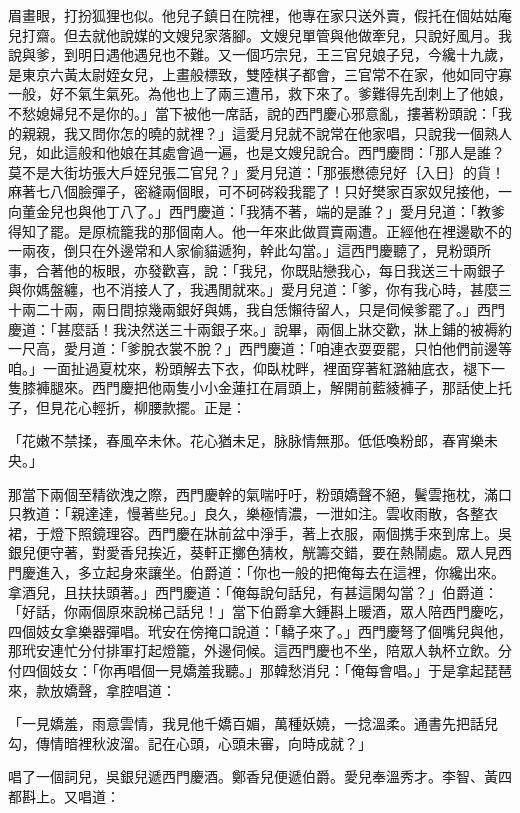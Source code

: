 眉畫眼，打扮狐狸也似。他兒子鎮日在院裡，他專在家只送外賣，假托在個姑姑庵兒打齋。但去就他說媒的文嫂兒家落腳。文嫂兒單管與他做牽兒，只說好風月。我說與爹，到明日遇他遇兒也不難。又一個巧宗兒，王三官兒娘子兒，今纔十九歲，是東京六黃太尉姪女兒，上畫般標致，雙陸棋子都會，三官常不在家，他如同守寡一般，好不氣生氣死。為他也上了兩三遭吊，救下來了。爹難得先刮刺上了他娘，不愁媳婦兒不是你的。」當下被他一席話，說的西門慶心邪意亂，摟著粉頭說：「我的親親，我又問你怎的曉的就裡？」這愛月兒就不說常在他家唱，只說我一個熟人兒，如此這般和他娘在其處會過一遍，也是文嫂兒說合。西門慶問：「那人是誰？莫不是大街坊張大戶姪兒張二官兒？」愛月兒道：「那張懋德兒好｛入日｝的貨！麻著七八個臉彈子，密縫兩個眼，可不砢硶殺我罷了！只好樊家百家奴兒接他，一向董金兒也與他丁八了。」西門慶道：「我猜不著，端的是誰？」愛月兒道：「教爹得知了罷。是原梳籠我的那個南人。他一年來此做買賣兩遭。正經他在裡邊歇不的一兩夜，倒只在外邊常和人家偷貓遞狗，幹此勾當。」這西門慶聽了，見粉頭所事，合著他的板眼，亦發歡喜，說：「我兒，你既貼戀我心，每日我送三十兩銀子與你媽盤纏，也不消接人了，我遇閒就來。」愛月兒道：「爹，你有我心時，甚麼三十兩二十兩，兩日間掠幾兩銀好與媽，我自恁懶待留人，只是伺候爹罷了。」西門慶道：「甚麼話！我決然送三十兩銀子來。」說畢，兩個上牀交歡，牀上鋪的被褥約一尺高，愛月道：「爹脫衣裳不脫？」西門慶道：「咱連衣耍耍罷，只怕他們前邊等咱。」一面扯過夏枕來，粉頭解去下衣，仰臥枕畔，裡面穿著紅潞紬底衣，褪下一隻膝褲腿來。西門慶把他兩隻小小金蓮扛在肩頭上，解開前藍綾褲子，那話使上托子，但見花心輕折，柳腰款擺。正是：

「花嫩不禁揉，春風卒未休。花心猶未足，脉脉情無那。低低喚粉郎，春宵樂未央。」

那當下兩個至精欲洩之際，西門慶幹的氣喘吁吁，粉頭嬌聲不絕，鬢雲拖枕，滿口只教道：「親達達，慢著些兒。」良久，樂極情濃，一泄如注。雲收雨散，各整衣裙，于燈下照鏡理容。西門慶在牀前盆中淨手，著上衣服，兩個携手來到席上。吳銀兒便守著，對愛香兒挨近，葵軒正擲色猜枚，觥籌交錯，要在熱鬧處。眾人見西門慶進入，多立起身來讓坐。伯爵道：「你也一般的把俺每去在這裡，你纔出來。拿酒兒，且扶扶頭著。」西門慶道：「俺每說句話兒，有甚這閑勾當？」伯爵道：「好話，你兩個原來說梯己話兒！」當下伯爵拿大鍾斟上暖酒，眾人陪西門慶吃，四個妓女拿樂器彈唱。玳安在傍掩口說道：「轎子來了。」西門慶弩了個嘴兒與他，那玳安連忙分付排軍打起燈籠，外邊伺候。這西門慶也不坐，陪眾人執杯立飲。分付四個妓女：「你再唱個一見嬌羞我聽。」那韓愁消兒：「俺每會唱。」于是拿起琵琶來，款放嬌聲，拿腔唱道：

「一見嬌羞，雨意雲情，我見他千嬌百媚，萬種妖嬈，一捻溫柔。通書先把話兒勾，傳情暗裡秋波溜。記在心頭，心頭未審，向時成就？」

唱了一個詞兒，吳銀兒遞西門慶酒。鄭香兒便遞伯爵。愛兒奉溫秀才。李智、黃四都斟上。又唱道：

